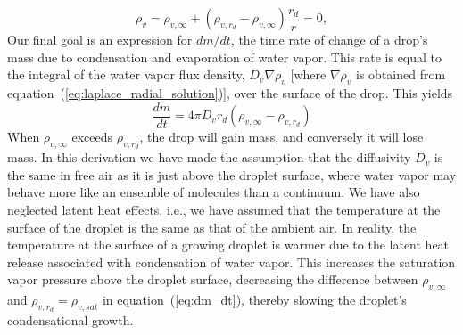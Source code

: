 \documentclass{report}
\begin{document}
\begin{equation}
    \rho_v = \rho_{v, \infty} + (\rho_{v, r_d} - \rho_{v, \infty}) \frac{r_{d}}{r} = 0, 
    \label{eq:laplace_radial_solution}
\end{equation}
Our final goal is an expression for $dm/dt$, the time rate of change of a drop's mass due to condensation and evaporation of water vapor. This rate is equal to the integral of the water vapor flux density, $D_v \nabla \rho_v$ [where $\nabla \rho_v$ is obtained from equation~(\ref{eq:laplace_radial_solution})], over the surface of the drop. This yields
\begin{equation}
    \frac{dm}{dt} = 4 \pi D_v r_d (\rho_{v, \infty} - \rho_{v, r_d}) 
    \label{eq:dm_dt}
\end{equation}
When $\rho_{v, \infty}$ exceeds $\rho_{v, r_d}$, the drop will gain mass, and conversely it will lose mass. In this derivation we have made the assumption that the diffusivity $D_v$ is the same in free air as it is just above the droplet surface, where water vapor may behave more like an ensemble of molecules than a continuum. We have also neglected latent heat effects, i.e., we have assumed that the temperature at the surface of the droplet is the same as that of the ambient air. In reality, the temperature at the surface of a growing droplet is warmer due to the latent heat release associated with condensation of water vapor. This increases the saturation vapor pressure above the droplet surface, decreasing the difference between $\rho_{v, \infty}$ and $\rho_{v, r_d} = \rho_{v, sat}$ in equation~({\ref{eq:dm_dt}}), thereby slowing the droplet's condensational growth.
\end{document}
